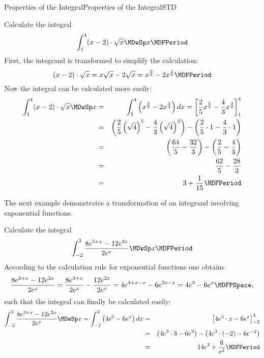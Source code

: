 \begin{MXContent}{Properties of the Integral}{Properties of the Integral}{STD}
\begin{MExample}
Calculate the integral
\[
\int_{1}^{4} (x - 2) \cdot \sqrt{x} \MDwSp x \MDFPeriod %
\]
First, the integrand is transformed to simplify the calculation:
\[
 (x - 2) \cdot \sqrt{x} = x \sqrt{x} - 2 \sqrt{x} %
 = x^{\frac{3}{2}} - 2 x^{\frac{1}{2}} \MDFPeriod %
\]
Now the integral can be calculated more easily:
\begin{eqnarray*}
\int_{1}^{4} (x - 2) \cdot \sqrt{x} \MDwSp x %
& = &
\int_{1}^{4} \left(x^{\frac{3}{2}} - 2 x^{\frac{1}{2}}\right) \MD x %
  =  
\left[\frac{2}{5} x^{\frac{5}{2}} - \frac{4}{3} x^{\frac{3}{2}}\right]_{1}^{4} \\
& = &
\left(\frac{2}{5} \left(\sqrt{4}\right)^5 - \frac{4}{3} \left(\sqrt{4}\right)^3 \right) %
 - \left(\frac{2}{5} \cdot 1 - \frac{4}{3} \cdot 1 \right) \\
& = &
\left(\frac{64}{5} - \frac{32}{3}\right) - \left(\frac{2}{5} - \frac{4}{3}\right) \\
& = & \frac{62}{5} - \frac{28}{3} \\
& = & 3 + \frac{1}{15} \MDFPeriod %
\end{eqnarray*}
\end{MExample}


The next example demonstrates a transformation of an integrand involving exponential functions.


\begin{MExample}
Calculate the integral 
\[
\int_{-2}^{3} \frac{8 \MEU^{3 + x} - 12 \MEU^{2 x}}{2 \MEU^{x}} \MDwSp x \MDFPeriod %
\]
According to the calculation rule for exponential functions one obtains
\[
\frac{8 \MEU^{3 + x} - 12 \MEU^{2 x}}{2 \MEU^{x}} %
= \frac{8 \MEU^{3 + x}}{2 \MEU^{x}} - \frac{12 \MEU^{2 x}}{2 \MEU^{x}} %
= 4 \MEU^{3 + x - x} - 6 \MEU^{2 x - x} %
= 4 \MEU^{3} - 6 \MEU^{x} \MDFPSpace, %
\]
such that the integral can finally be calculated easily:
\begin{eqnarray*}
\int_{-2}^{3} \frac{8 \MEU^{3 + x} - 12 \MEU^{2 x}}{2 \MEU^{x}} \MDwSp x %
= 
\int_{-2}^{3} \left( 4 \MEU^{3} - 6 \MEU^{x} \right) \MD x %
& = & 
\left[4 \MEU^{3} \cdot x - 6 \MEU^{x} \right]_{-2}^{3} \\
& = & 
\left(4 \MEU^{3} \cdot 3 - 6 \MEU^{3} \right) %
 - \left(4 \MEU^{3} \cdot (-2) - 6 \MEU^{-2} \right) \\
& = &
14 \MEU^{3} + \frac{6}{\MEU^{2}} \MDFPeriod %
\end{eqnarray*}
\end{MExample}


\end{MXContent}
